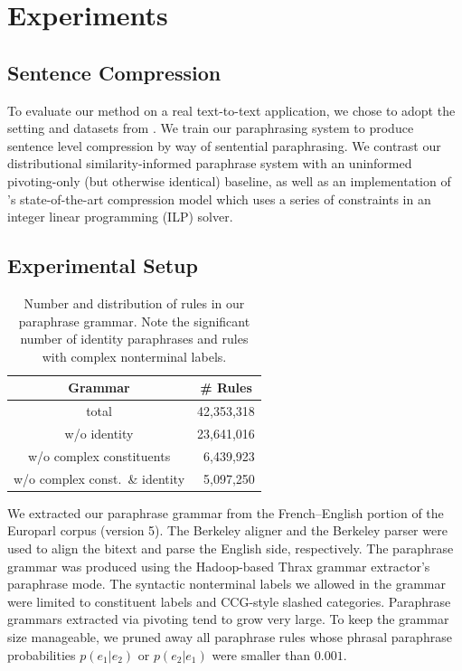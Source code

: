 \documentclass[11pt]{article}
\begin{document}
\section{Experiments}
\label{sec-results}

\subsection{Sentence Compression}

To evaluate our method on a real text-to-text application, we chose to
adopt the setting and datasets from \cite{Ganitkevitch2011}. We train
our paraphrasing system to produce sentence level compression by way
of sentential paraphrasing. We contrast our distributional
similarity-informed paraphrase system with an uninformed pivoting-only
(but otherwise identical) baseline, as well as an implementation of
's state-of-the-art compression model which uses a
series of constraints in an integer linear programming (ILP) solver.

\subsection{Experimental Setup}
\label{sec-setup}

\begin{table}
\small
\begin{center}
\begin{tabular}{|c|r|}
  \hline
  Grammar & \multicolumn{1}{c|}{\# Rules} \\
  \hline
  total & 42,353,318 \\
  w/o identity & 23,641,016 \\
  w/o complex constituents & 6,439,923 \\
  w/o complex const.\ \& identity & 5,097,250 \\
  \hline
\end{tabular}
\end{center}
\normalsize
\caption{Number and distribution of rules in our paraphrase
  grammar. Note the significant number of identity paraphrases and
  rules with complex nonterminal labels.}
\label{grammar_stats}
\end{table}

We extracted our paraphrase grammar from the French--English portion
of the Europarl corpus (version 5). The Berkeley aligner and the
Berkeley parser were used to align the bitext and parse the English
side, respectively. The paraphrase grammar was produced using the
Hadoop-based Thrax grammar extractor's paraphrase mode. The syntactic
nonterminal labels we allowed in the grammar were limited to
constituent labels and CCG-style slashed categories. Paraphrase
grammars extracted via pivoting tend to grow very large. To keep the
grammar size manageable, we pruned away all paraphrase rules whose
phrasal paraphrase probabilities $p(e_1|e_2)$ or $p(e_2|e_1)$ were
smaller than $0.001$.
\end{document}
